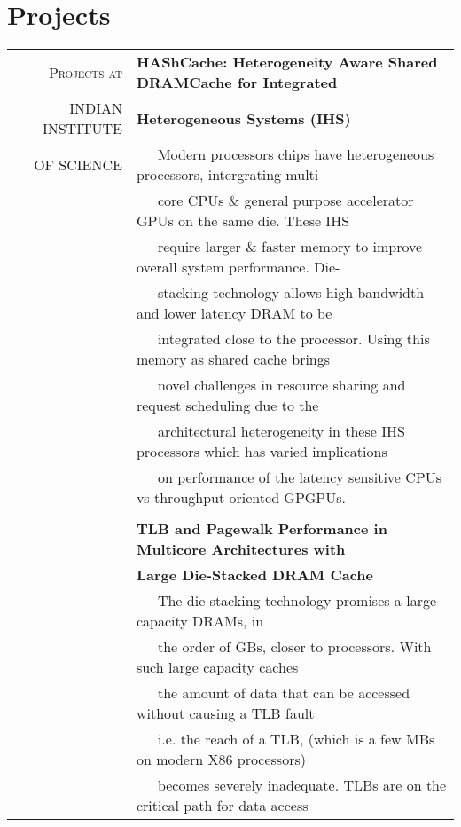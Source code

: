 \documentclass[a4paper,10pt]{article} %
\begin{document}

\section{Projects}

\begin{tabular}{rl}
\textsc{Projects at} & \textbf{HAShCache: Heterogeneity Aware Shared DRAMCache for Integrated } \\
\textsc{INDIAN INSTITUTE} & \textbf{Heterogeneous Systems (IHS) } \\
\textsc{OF SCIENCE} & ~~~Modern processors chips have heterogeneous processors, intergrating multi-\\
& ~~~core CPUs \& general purpose accelerator GPUs on the same die. These IHS\\
& ~~~require larger \& faster memory to improve overall system performance. Die-\\
& ~~~stacking technology allows high bandwidth and lower latency DRAM to be\\
& ~~~integrated close to the processor. Using this memory as shared cache brings\\
& ~~~novel challenges in resource sharing and request scheduling due to the\\
& ~~~architectural heterogeneity in these IHS processors which has varied implications\\
& ~~~on performance of the latency sensitive CPUs vs throughput oriented GPGPUs.\\
& \\
& \textbf{TLB and Pagewalk Performance in Multicore Architectures with} \\
& \textbf{Large Die-Stacked DRAM Cache }\\
& ~~~The die-stacking technology promises a large capacity DRAMs, in\\
& ~~~the order of GBs, closer to processors. With such large capacity caches\\
& ~~~the amount of data that can be accessed without causing a TLB fault\\
& ~~~i.e. the reach of a TLB, (which is a few MBs on modern X86 processors)\\
& ~~~becomes severely inadequate. TLBs are on the critical path for data access\\

\end{tabular}
\end{document}
